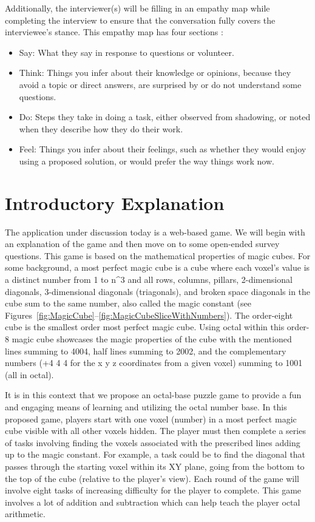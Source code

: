 \documentclass{article}
\begin{document}
Additionally, the interviewer(s) will be filling in an empathy map while completing the interview to ensure that the conversation fully covers the interviewee's stance. This empathy map has four sections \citep{EmpathyMap}:

\begin{itemize}
    \item Say: What they say in response to questions or volunteer.
    \item Think: Things you infer about their knowledge or opinions, because they avoid a topic or direct answers, are surprised by or do not understand some questions.
    \item Do: Steps they take in doing a task, either observed from shadowing, or noted when they describe how they do their work.
    \item Feel: Things you infer about their feelings, such as whether they would enjoy using a proposed solution, or would prefer the way things work now.
\end{itemize}

\section{Introductory Explanation}

The application under discussion today is a web-based game. We will begin with an explanation of the game and then move on to some open-ended survey questions. This game is based on the mathematical properties of magic cubes. For some background, a most perfect magic cube is a cube where each voxel's value is a distinct number from 1 to n\textasciicircum{}3 and all rows, columns, pillars, 2-dimensional diagonals, 3-dimensional diagonals (triagonals), and broken space diagonals in the cube sum to the same number, also called the magic constant (see Figures~\ref{fig:MagicCube}--\ref{fig:MagicCubeSliceWithNumbers}). The order-eight cube is the smallest order most perfect magic cube. Using octal within this order-8 magic cube showcases the magic properties of the cube with the mentioned lines summing to 4004, half lines summing to 2002, and the complementary numbers (+4 4 4 for the x y z coordinates from a given voxel) summing to 1001 (all in octal).

It is in this context that we propose an octal-base puzzle game to provide a fun and engaging means of learning and utilizing the octal number base. In this proposed game, players start with one voxel (number) in a most perfect magic cube visible with all other voxels hidden. The player must then complete a series of tasks involving finding the voxels associated with the prescribed lines adding up to the magic constant. For example, a task could be to find the diagonal that passes through the starting voxel within its XY plane, going from the bottom to the top of the cube (relative to the player's view). Each round of the game will involve eight tasks of increasing difficulty for the player to complete. This game involves a lot of addition and subtraction which can help teach the player octal arithmetic.
\end{document}
